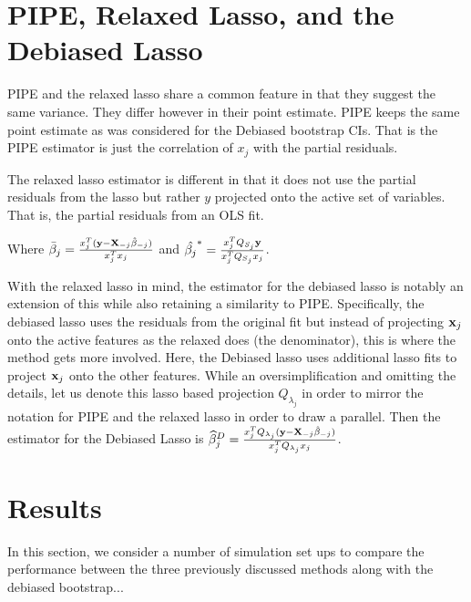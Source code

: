 \section{PIPE, Relaxed Lasso, and the Debiased Lasso}

PIPE and the relaxed lasso share a common feature in that they suggest the same variance. They differ however in their point estimate. PIPE keeps the same point estimate as was considered for the Debiased bootstrap CIs. That is the PIPE estimator is just the correlation of $x_j$ with the partial residuals.

The relaxed lasso estimator is different in that it does not use the partial residuals from the lasso but rather $y$ projected onto the active set of variables. That is, the partial residuals from an OLS fit. 


Where $\bar{\beta}_j = \frac{x_j^T(\mathbf{y} - \mathbf{X}_{-j}\hat{\beta}_{-j})}{x_j^T x_j}$ and $\hat{\beta_j}^* = \frac{x_j^T Q_{S_j} \mathbf{y}}{x_j^T Q_{S_j} x_j}$.

With the relaxed lasso in mind, the estimator for the debiased lasso is notably an extension of this while also retaining a similarity to PIPE. Specifically, the debiased lasso uses the residuals from the original fit but instead of projecting $\mathbf{x}_j$ onto the active features as the relaxed does (the denominator), this is where the method gets more involved. Here, the Debiased lasso uses additional lasso fits to project $\mathbf{x}_j$ onto the other features. While an oversimplification and omitting the details, let us denote this lasso based projection $Q_{\lambda_j}$ in order to mirror the notation for PIPE and the relaxed lasso in order to draw a parallel. Then the estimator for the Debiased Lasso is $\widehat{\beta}_j^D = \frac{x_j^T Q_{\lambda_j} (\mathbf{y} - \mathbf{X}_{-j}\hat{\beta}_{-j})}{x_j^T Q_{\lambda_j} x_j}$.


\section{Results}

In this section, we consider a number of simulation set ups to compare the performance between the three previously discussed methods along with the debiased bootstrap...

